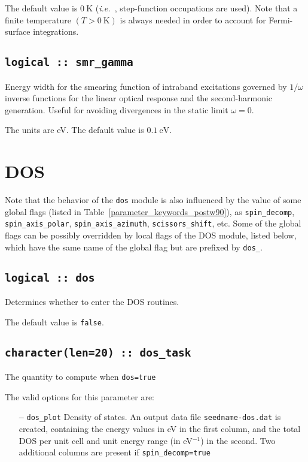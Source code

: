 The default value is $0~\mathrm{K}$ (\textit{i.e.~}, step-function occupations are used). Note that a finite temperature $(T>0~\mathrm{K})$ is always needed in order to account for Fermi-surface integrations.

\subsection{\tt logical :: smr\_gamma}

Energy width for the smearing function of intraband excitations governed by $1/\omega$ inverse functions for the linear optical response and the second-harmonic generation. Useful for avoiding divergences in the static limit $\omega=0$.

The units are eV. The default value is $0.1~\mathrm{eV}$.

\clearpage
\section{DOS}
Note that the behavior of the \verb#dos# module  is also influenced by
the value of some global flags (listed in
Table~\ref{parameter_keywords_postw90}), as
\verb#spin_decomp#, \verb#spin_axis_polar#, \verb#spin_axis_azimuth#,
\verb#scissors_shift#, etc.
Some of the global flags can be possibly
overridden by local flags of the DOS module, listed below, which have
the same name of the global flag but are prefixed by \verb#dos_#.

\subsection[dos]{\tt logical :: dos}
Determines whether to enter the DOS routines.

The default value is \verb#false#.


\subsection[dos\_task]{\tt character(len=20) ::  dos\_task}
The quantity to compute when {\tt dos=true}

The valid options for this parameter are:
\begin{itemize}
\item[{\bf --}] \verb#dos_plot# Density of states. An output data file
  {\tt seedname-dos.dat} is created, containing the energy values in
  eV in the first column, and the total DOS per unit cell and unit
  energy range (in eV$^{-1}$) in the second. Two additional columns
  are present if {\tt spin\_decomp=true}
\end{itemize}



